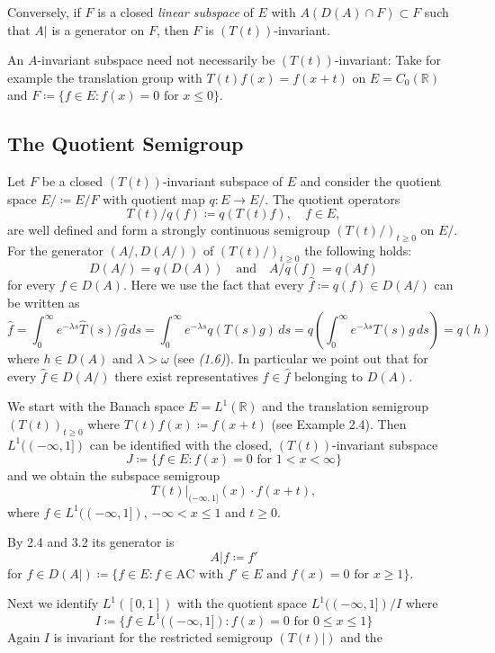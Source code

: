\newpage

Conversely, if $F$ is a closed \emph{linear subspace} of $E$ with $A(D(A) \cap F) \subset F$ such that $A|$ is a generator on $F$, then $F$ is $(T(t))$-invariant.

An $A$-invariant subspace need not necessarily be $(T(t))$-invariant:
Take for example the translation group with $T(t)f(x) = f(x+t)$ on $E = C_{0}(\mathbb{R})$ and $F \coloneqq \{f \in E : f(x) = 0 \text{ for } x \leq 0\}$.
\subsection{The Quotient Semigroup}\label{subsec:a1-3.3}
Let $F$ be a closed $(T(t))$-invariant subspace of $E$ and consider the quotient space $E/ \coloneqq E/F$ with quotient map $q : E \to E/$. 
The quotient operators
\[
    T(t)/q(f) \coloneqq q(T(t)f), \quad f \in E,
\]
are well defined and form a strongly continuous semigroup $(T(t)/)_{t \geq 0}$ on $E/$.
For the generator $(A/,D(A/))$ of $(T(t)/)_{t \geq 0}$ the following holds:
\[
    D(A/) = q(D(A)) \quad \text{and} \quad A/q(f) = q(Af)
\]
for every $f \in D(A)$.
Here we use the fact that every $\hat{f} \coloneqq q(f) \in D(A/)$ can be written as
\[
    \hat{f} = \int_{0}^{\infty} e^{-\lambda s} \hat{T}(s)/\hat{g} \,ds = \int_{0}^{\infty} e^{-\lambda s}q(T(s)g) \,ds = q(\int_{0}^{\infty} e^{-\lambda s}T(s)g \,ds) = q(h)
\]
where $h \in D(A)$ and $\lambda > \omega$ (see \emph{(1.6)}).
In particular we point out that for every $\hat{f} \in D(A/)$ there exist representatives $f \in \hat{f}$ belonging to $D(A)$.

\begin{example}\label{ex:a1-3.1}
We start with the Banach space $E = L^{1}(\mathbb{R})$ and the translation semigroup $(T(t))_{t \geq 0}$ where $T(t)f(x) \coloneqq f(x+t)$ (see Example 2.4).
Then $L^{1}((-\infty,1])$ can be identified with the closed, $(T(t))$-invariant subspace
\[
    J \coloneqq \{f \in E : f(x) = 0 \text{ for } 1 < x < \infty\}
\]
and we obtain the subspace semigroup
\[
    T(t)|_{(-\infty,1]}(x) \cdot f(x+t),
\]
where $f \in L^{1}((-\infty,1])$, $-\infty < x \leq 1$ and $t \geq 0$.

By 2.4 and 3.2 its generator is
\[
    A|f \coloneqq f'
\]
for $f \in D(A|) \coloneqq \{f \in E : f \in \text{AC} \text{ with } f' \in E \text{ and } f(x) = 0 \text{ for } x \geq 1\}$.

Next we identify $L^{1}([0,1])$ with the quotient space $L^{1}((-\infty,1])/I$ where
\[
    I \coloneqq \{f \in L^{1}((-\infty,1]) : f(x) = 0 \text{ for } 0 \leq x \leq 1\}
\]
Again $I$ is invariant for the restricted semigroup $(T(t)|)$ and the

\end{example}


